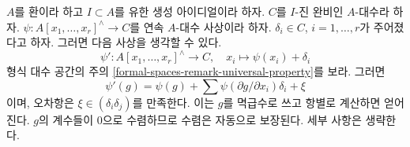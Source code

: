 \begin{remark}[선형 근사]
\label{remark-linear-approximation}
$A$를 환이라 하고 $I \subset A$를 유한 생성 아이디얼이라 하자.
$C$를 $I$-진 완비인 $A$-대수라 하자.
$\psi : A[x_1, \ldots, x_r]^\wedge \to C$를 연속 $A$-대수 사상이라 하자.
$\delta_i \in C$, $i = 1, \ldots, r$가 주어졌다고 하자.
그러면 다음 사상을 생각할 수 있다.
$$
\psi' : A[x_1, \ldots, x_r]^\wedge \to C,\quad
x_i \longmapsto \psi(x_i) + \delta_i
$$
형식 대수 공간의 주의 \ref{formal-spaces-remark-universal-property}를 보라.
그러면
$$
\psi'(g) = \psi(g) + \sum \psi(\partial g/\partial x_i)\delta_i + \xi
$$
이며, 오차항은 $\xi \in (\delta_i\delta_j)$를 만족한다.
이는 $g$를 멱급수로 쓰고 항별로 계산하면 얻어진다.
$g$의 계수들이 0으로 수렴하므로 수렴은 자동으로 보장된다.
세부 사항은 생략한다.
\end{remark}

